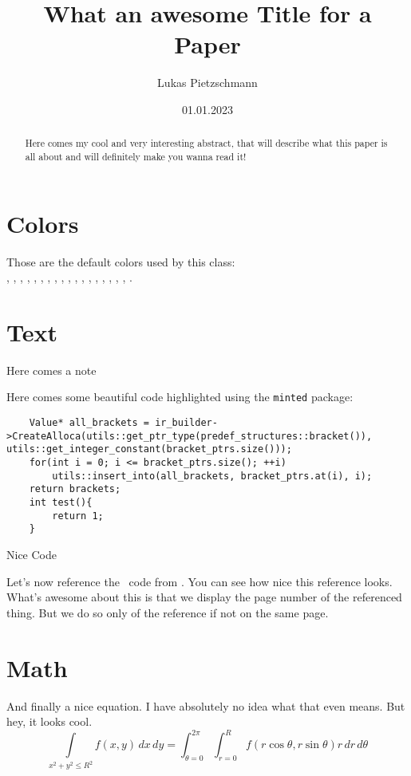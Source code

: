 \documentclass[english, sidenote, awesomeminted]{thesis}
\title{What an awesome Title for a Paper}
\author{Lukas Pietzschmann}
\date{01.01.2023}
\begin{document}
\maketitle

\begin{abstract}
	Here comes my cool and very interesting abstract, that will describe what this paper is all about
	and will definitely make you wanna read it!
	\lipsum[2-3]
\end{abstract}

\tableofcontents

\emptypage
\setcounter{page}{1}

\section{Colors}
Those are the default colors used by this class:\\
, , , , , ,
, , , , , ,
, , , , , , .

\section{Text}
\lipsum[1-3]
Here comes a note
\lipsum[1]
\par
Here comes some beautiful code highlighted using the \texttt{minted} package:
\begin{listing}[H]
\begin{verbatim}
	Value* all_brackets = ir_builder->CreateAlloca(utils::get_ptr_type(predef_structures::bracket()), utils::get_integer_constant(bracket_ptrs.size()));
	for(int i = 0; i <= bracket_ptrs.size(); ++i)
		utils::insert_into(all_brackets, bracket_ptrs.at(i), i);
	return brackets;
	int test(){
		return 1;
	}
\end{verbatim}
\caption{Nice Code}
\label{lst:test}
\end{listing}
\lipsum[1-4]\par
Let's now reference the \cpp~code from . You can see how nice this reference looks. What's awesome about this is that we display the page
number of the referenced thing. But we do so only of the reference if not on the same page.

\section{Math}
And finally a nice equation. I have absolutely no idea what that even means. But hey, it looks cool.
\begin{equation}
	\int\limits_{x^2 + y^2 \leq R^2}f(x,y)\,dx\,dy
	= \int_{\theta=0}^{2\pi} \int_{r=0}^R
	f(r\cos\theta,r\sin\theta) r\,dr\,d\theta
\end{equation}
\lipsum[1-2]

\begin{appendix}
\listoflistings
\end{appendix}
\end{document}
